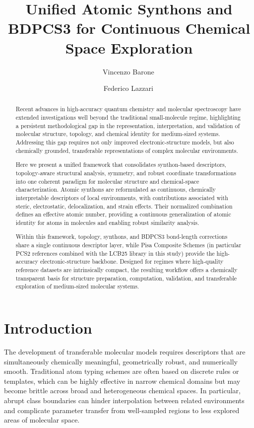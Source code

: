 \documentclass[journal=jctcce,manuscript=article]{achemso}
\title{Unified Atomic Synthons and BDPCS3 for Continuous Chemical Space Exploration}
\author{Vincenzo Barone\,\orcidlink{0000-0001-6420-4107}}
\affiliation[c]{INSTM, via G. Giusti 9, 50121 Firenze, Italy}
\author{Federico Lazzari\,\orcidlink{0000-0003-4506-3200}}
\affiliation{Scuola Superiore Meridionale, Largo San Marcellino 10, 80138 Napoli (Italy)}
\begin{document}
\begin{abstract}
Recent advances in high-accuracy quantum chemistry and molecular spectroscopy have extended investigations well beyond the traditional small-molecule regime, highlighting a persistent methodological gap in the representation, interpretation, and validation of molecular structure, topology, and chemical identity for medium-sized systems. Addressing this gap requires not only improved electronic-structure models, but also chemically grounded, transferable representations of complex molecular environments.

Here we present a unified framework that consolidates synthon-based descriptors, topology-aware structural analysis, symmetry, and robust coordinate transformations into one coherent paradigm for molecular structure and chemical-space characterization. Atomic synthons are reformulated as continuous, chemically interpretable descriptors of local environments, with contributions associated with steric, electrostatic, delocalization, and strain effects. Their normalized combination defines an effective atomic number, providing a continuous generalization of atomic identity for atoms in molecules and enabling robust similarity analysis.

Within this framework, topology, synthons, and BDPCS3 bond-length corrections share a single continuous descriptor layer, while Pisa Composite Schemes (in particular PCS2 references combined with the LCB25 library in this study) provide the high-accuracy electronic-structure backbone. Designed for regimes where high-quality reference datasets are intrinsically compact, the resulting workflow offers a chemically transparent basis for structure preparation, computation, validation, and transferable exploration of medium-sized molecular systems.
\end{abstract}

\section{Introduction}
The development of transferable molecular models requires descriptors that are simultaneously chemically meaningful, geometrically robust, and numerically smooth. Traditional atom typing schemes are often based on discrete rules or templates, which can be highly effective in narrow chemical domains but may become brittle across broad and heterogeneous chemical spaces. In particular, abrupt class boundaries can hinder interpolation between related environments and complicate parameter transfer from well-sampled regions to less explored areas of molecular space.
\end{document}
